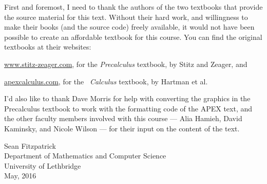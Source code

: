 First and foremost, I need to thank the authors of the two textbooks that provide the source material for this text. Without their hard work, and willingness to make their books (and the source code) freely available, it would not have been possible to create an affordable textbook for this course. You can find the original textbooks at their websites:

\bigskip


\href{http://www.stitz-zeager.com}{www.stitz-zeager.com}, for the \textit{Precalculus} textbook, by Stitz and Zeager, and

\bigskip


\href{http://www.apexcalculus.com}{apexcalculus.com}, for the \apex\ \textit{Calculus} textbook, by Hartman et al.

\bigskip

I'd also like to thank Dave Morris for help with converting the graphics in the Precalculus textbook to work with the formatting code of the APEX text, and the other faculty members involved with this course --- Alia Hamieh, David Kaminsky, and Nicole Wilson --- for their input on the content of the text.

\vspace{1in}

\begin{raggedright}
Sean Fitzpatrick\\
Department of Mathematics and Computer Science\\
University of Lethbridge\\
May, 2016
\end{raggedright}




